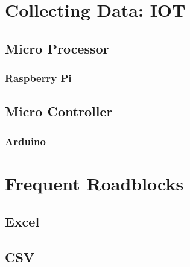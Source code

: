 \chapter{Collecting Data: IOT}

\section{Micro Processor}

\subsection{Raspberry Pi}

\section{Micro Controller}

\subsection{Arduino}


\chapter{Frequent Roadblocks}

\section{Excel}

\section{CSV}
